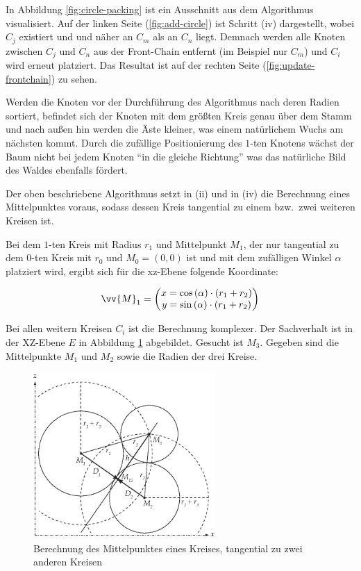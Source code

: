 In Abbildung \ref{fig:circle-packing} ist ein Ausschnitt aus dem Algorithmus visualisiert. Auf der linken Seite (\ref{fig:add-circle}) ist Schritt (iv) dargestellt, wobei $C_j$ existiert und und näher an $C_m$ als an $C_n$ liegt. Demnach werden alle Knoten zwischen $C_j$ und $C_n$ aus der Front-Chain entfernt (im Beispiel nur $C_m$) und $C_i$ wird erneut platziert. Das Resultat ist auf der rechten Seite (\ref{fig:update-frontchain}) zu sehen.

Werden die Knoten vor der Durchführung des Algorithmus nach deren Radien sortiert, befindet sich der Knoten mit dem größten Kreis genau über dem Stamm und nach außen hin werden die Äste kleiner, was einem natürlichem Wuchs am nächsten kommt. Durch die zufällige Positionierung des $1$-ten Knotens wächst der Baum nicht bei jedem Knoten "`in die gleiche Richtung"' was das natürliche Bild des Waldes ebenfalls fördert.

Der oben beschriebene Algorithmus setzt in (ii) und in (iv) die Berechnung eines Mittelpunktes voraus, sodass dessen Kreis tangential zu einem bzw.\ zwei weiteren Kreisen ist.

Bei dem $1$-ten Kreis mit Radius $r_1$ und Mittelpunkt $M_1$, der nur tangential zu dem $0$-ten Kreis mit $r_0$ und $M_0 = (0,0)$ ist und mit dem zufälligen Winkel $\alpha$ platziert wird, ergibt sich für die xz-Ebene folgende Koordinate:

\begin{equation}
  \vv{M}_1 =
  \begin{pmatrix}
    x = \cos\left(\alpha\right) \cdot \left(r_1 + r_2\right)\\
    y = \sin\left(\alpha\right) \cdot \left(r_1 + r_2\right)\\
  \end{pmatrix}
\end{equation}

Bei allen weitern Kreisen $C_i$ ist die Berechnung komplexer. Der Sachverhalt ist in der XZ-Ebene $E$ in Abbildung \ref{fig:tangent-circle} abgebildet. Gesucht ist $M_3$. Gegeben sind die Mittelpunkte $M_1$ und $M_2$ sowie die Radien der drei Kreise.

\begin{figure}[htb]
  \includegraphics[width=261.593px]{figures/tangent-circle}
  \caption{Berechnung des Mittelpunktes eines Kreises, tangential zu zwei anderen Kreisen}
  \label{fig:tangent-circle}
\end{figure}

